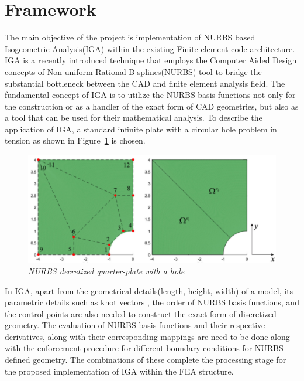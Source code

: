 \documentclass[submit,12pt]{aiaa-pretty} %
\begin{document}
\section{Framework}
The main objective of the project is implementation of NURBS based Isogeometric Analysis(IGA) within the existing Finite element code architecture. IGA is a recently introduced technique that employs the Computer Aided Design concepts of Non-uniform Rational B-splines(NURBS) tool to bridge the substantial  bottleneck between the CAD and finite element analysis field. The fundamental concept of IGA is to utilize the NURBS basis functions not only for the construction or as a handler of the exact form of CAD geometries, but also as a tool that can be used for their mathematical analysis. To describe the application of IGA, a standard infinite plate with a circular hole problem in tension as shown in Figure~\ref{fig:iga-demo} is chosen. 
\begin{figure}[h] 
  \centering
  \includegraphics[width=0.5\linewidth]{iga-demo.pdf}
  \caption{\emph{NURBS decretized quarter-plate with a hole}}
  \label{fig:iga-demo}
\end{figure}
In IGA, apart from the geometrical details(length, height, width) of a
model, its parametric details such as knot vectors , the order of
NURBS basis functions, and the control points are also needed to
construct the exact form of discretized geometry. The evaluation of
NURBS basis functions and their respective derivatives, along with
their corresponding mappings are need to be done along with the
enforcement procedure for different boundary conditions for NURBS
defined geometry. The combinations of these complete the processing
stage for the proposed implementation of IGA within the FEA structure.
\end{document}
